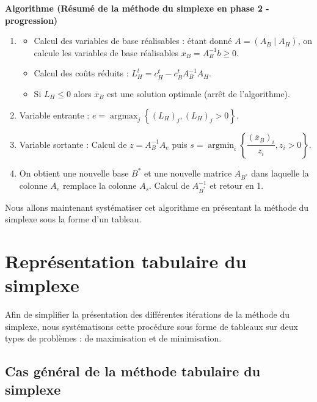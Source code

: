 \documentclass[a4paper,12pt,openany]{book}
\newenvironment{colorframed}{%
	\def\FrameCommand{\fboxsep=10pt \fcolorbox{black}{bggray}}%
	\MakeFramed{\advance\hsize-\width \FrameRestore}%
}{\endMakeFramed}
\theoremstyle{plain}
\theoremstyle{definition}
\theoremstyle{remark}
\theoremstyle{nbstyle}
\begin{document}
	\begin{colorframed}
		{\color{titleblue}\textbf{Algorithme (Résumé de la méthode du simplexe en phase 2 - progression)}}
		
		\medskip
		\begin{enumerate}
			\item \begin{itemize}
				\item Calcul des variables de base réalisables : étant donné $A = (A_{B} \mid A_{H})$, on calcule les variables de base réalisables $x_{B} = A_{B}^{-1} b \geq 0$.
				\item Calcul des coûts réduits : $L_{H}^{t} = c_{H}^{t} - c_{B}^{t} A_{B}^{-1} A_{H}$.
				\item Si $L_{H} \leq 0$ alors $\bar{x}_{B}$ est une solution optimale (arrêt de l'algorithme).
			\end{itemize}
			\item Variable entrante : $e = \operatorname{argmax}_{j} \left\{ (L_{H})_{j}, (L_{H})_{j} > 0 \right\}$.
			\item Variable sortante : Calcul de $z = A_{B}^{-1} A_{e}$ puis $s = \operatorname{argmin}_{i} \left\{ \dfrac{(\bar{x}_{B})_{i}}{z_{i}}, z_{i} > 0 \right\}$.
			\item On obtient une nouvelle base $B^{*}$ et une nouvelle matrice $A_{B^{*}}$ dans laquelle la colonne $A_{e}$ remplace la colonne $A_{s}$. Calcul de $A_{B^{*}}^{-1}$ et retour en 1.
		\end{enumerate}
	\end{colorframed}
	
	Nous allons maintenant systématiser cet algorithme en présentant la méthode du simplexe sous la forme d'un tableau.
	
	\section{Représentation tabulaire du simplexe}
	
	Afin de simplifier la présentation des différentes itérations de la méthode du simplexe, nous systématisons cette procédure sous forme de tableaux sur deux types de problèmes : de maximisation et de minimisation.
	
	\subsection{Cas général de la méthode tabulaire du simplexe}
	
\end{document}
